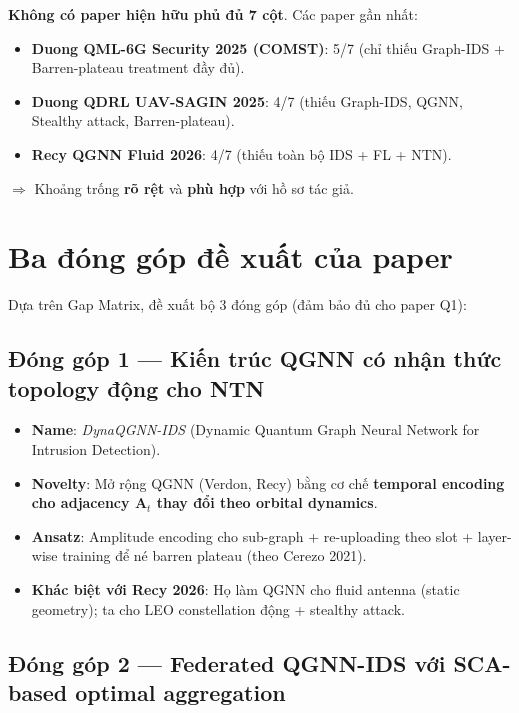 \documentclass[11pt,a4paper]{article}
\begin{document}
\begin{goldbox}
\textbf{Không có paper hiện hữu phủ đủ 7 cột}. Các paper gần nhất:
\begin{itemize}
  \item \textbf{Duong QML-6G Security 2025 (COMST)}: 5/7 (chỉ thiếu Graph-IDS + Barren-plateau treatment đầy đủ).
  \item \textbf{Duong QDRL UAV-SAGIN 2025}: 4/7 (thiếu Graph-IDS, QGNN, Stealthy attack, Barren-plateau).
  \item \textbf{Recy QGNN Fluid 2026}: 4/7 (thiếu toàn bộ IDS + FL + NTN).
\end{itemize}
$\Rightarrow$ Khoảng trống \textbf{rõ rệt} và \textbf{phù hợp} với hồ sơ tác giả.
\end{goldbox}

\section{Ba đóng góp đề xuất của paper}

Dựa trên Gap Matrix, đề xuất bộ 3 đóng góp (đảm bảo đủ cho paper Q1):

\subsection{Đóng góp 1 --- Kiến trúc QGNN có nhận thức topology động cho NTN}

\begin{itemize}
  \item \textbf{Name}: \textit{DynaQGNN-IDS} (Dynamic Quantum Graph Neural Network for Intrusion Detection).
  \item \textbf{Novelty}: Mở rộng QGNN (Verdon, Recy) bằng cơ chế \textbf{temporal encoding cho adjacency $\mathbf{A}_t$ thay đổi theo orbital dynamics}.
  \item \textbf{Ansatz}: Amplitude encoding cho sub-graph + re-uploading theo slot + layer-wise training để né barren plateau (theo Cerezo 2021).
  \item \textbf{Khác biệt với Recy 2026}: Họ làm QGNN cho fluid antenna (static geometry); ta cho LEO constellation động + stealthy attack.
\end{itemize}

\subsection{Đóng góp 2 --- Federated QGNN-IDS với SCA-based optimal aggregation}
\end{document}
